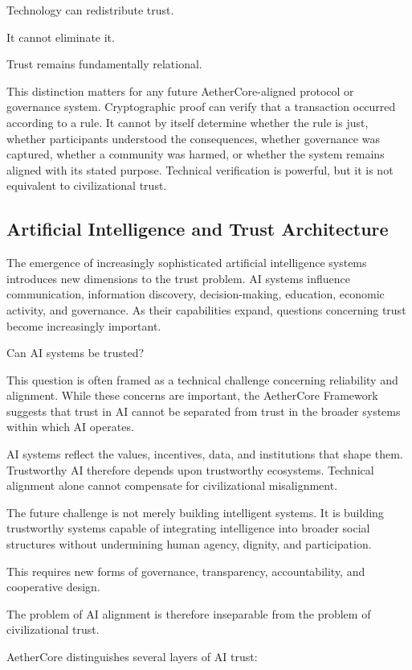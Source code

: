 \documentclass[12pt]{article}
\begin{document}
Technology can redistribute trust.

It cannot eliminate it.

Trust remains fundamentally relational.

This distinction matters for any future AetherCore-aligned protocol or governance system. Cryptographic proof can verify that a transaction occurred according to a rule. It cannot by itself determine whether the rule is just, whether participants understood the consequences, whether governance was captured, whether a community was harmed, or whether the system remains aligned with its stated purpose. Technical verification is powerful, but it is not equivalent to civilizational trust.

\subsection{Artificial Intelligence and Trust Architecture}

The emergence of increasingly sophisticated artificial intelligence systems introduces new dimensions to the trust problem. AI systems influence communication, information discovery, decision-making, education, economic activity, and governance. As their capabilities expand, questions concerning trust become increasingly important.

Can AI systems be trusted?

This question is often framed as a technical challenge concerning reliability and alignment. While these concerns are important, the AetherCore Framework suggests that trust in AI cannot be separated from trust in the broader systems within which AI operates.

AI systems reflect the values, incentives, data, and institutions that shape them. Trustworthy AI therefore depends upon trustworthy ecosystems. Technical alignment alone cannot compensate for civilizational misalignment.

The future challenge is not merely building intelligent systems. It is building trustworthy systems capable of integrating intelligence into broader social structures without undermining human agency, dignity, and participation.

This requires new forms of governance, transparency, accountability, and cooperative design.

The problem of AI alignment is therefore inseparable from the problem of civilizational trust.

AetherCore distinguishes several layers of AI trust:
\end{document}
